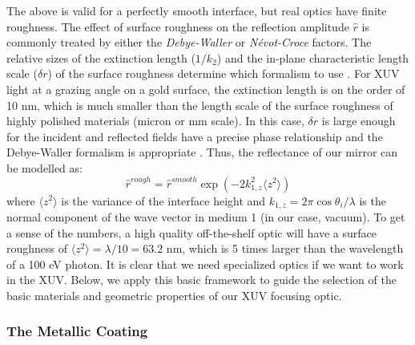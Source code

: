 %
%

The above is valid for a perfectly smooth interface, but real optics have finite roughness. The effect of surface roughness on the reflection amplitude $\hat{r}$ is commonly treated by either the \textit{Debye-Waller} or \textit{N\'evot-Croce} factors. The relative sizes of the extinction length ($1/k_2$) and the in-plane characteristic length scale ($\delta r$) of the surface roughness determine which formalism to use \cite{sentenacStatisticalAspectsWave2009, gibaudSpecularReflectivitySmooth2009}. For XUV light at a grazing angle on a gold surface, the extinction length is on the order of 10 nm, which is much smaller than the length scale of the surface roughness of highly polished materials (micron or mm scale). In this case, $\delta r$ is large enough for the incident and reflected fields have a precise phase relationship and the Debye-Waller formalism is appropriate \cite{stoevReviewGrazingIncidence1999}. Thus, the reflectance of our mirror can be modelled as:
\begin{equation}
\hat{r}^{rough} = \hat{r}^{smooth} \exp \left( -2 k_{1,z}^2 \langle z^2 \rangle \right)
\label{eqn:DW_2}
\end{equation}
where $ \langle z^2 \rangle$ is the variance of the interface height and $k_{1,z} = 2 \pi \cos \theta_i / \lambda$ is the normal component of the wave vector in medium 1 (in our case, vacuum). To get a sense of the numbers, a high quality off-the-shelf optic will have a surface roughness of $\langle z^2 \rangle = \lambda/10 = 63.2 \text{ nm}$, which is 5 times larger than the wavelength of a 100 eV photon. It is clear that we need specialized optics if we want to work in the XUV. Below, we apply this basic framework to guide the selection of the basic materials and geometric properties of our XUV focusing optic. 

\subsubsection{The Metallic Coating}

